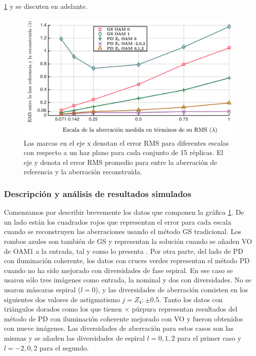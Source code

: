 \ref{fig:ChPD_RMS_error} y se discuten en adelante. 
\begin{figure}[h!]
\centering
\includegraphics[scale=.6]{WF_errors_new_colors_esp.pdf}
\caption[Resultados de simulaciones con PD de iluminación
coherente.]{Las marcas en el eje x denotan el error RMS para
  diferentes escalas con respecto a
  un haz plano para cada conjunto de 15 réplicas. El eje y denota el
  error RMS promedio para entre la aberración de referencia y la
  aberración reconstruída.} 
\label{fig:ChPD_RMS_error}
\end{figure}

\subsubsection{Descripción y análisis de resultados simulados}
Comenzamos por describir brevemente los datos que componen la gráfica
\ref{fig:ChPD_RMS_error}. De un lado están los cuadrados rojos que representan el error
para cada escala cuando se reconstruyen las aberraciones usando el
método GS tradicional. Los rombos azules son también de GS y
representan la solución cuando se añaden VO de OAM1 a la entrada, tal
y como lo presenta . Por otra parte, del lado
de PD con iluminación coherente, los datos con cruces verdes
representan el método PD cuando no ha sido mejorado con
diversidades de fase espiral.
En ese caso se usaron sólo tres imágenes como entrada, la nominal y
dos con diversidades. No se usaron máscaras espiral ($l=0$), y las
diversidades de aberración consisten en los siguientes dos valores de
astigmatismo $j=Z_4:\pm 0.5$. Tanto los datos con triángulos dorados
como los que tienen  $\times$ púrpura representan resultados del
método de PD con iluminación coherente mejorado con VO y fueron
obtenidos con nueve imágenes. Las diversidades de aberración para
estos casos son las mismas y se añaden las diversidades de espiral
$l=0,1,2$ para el primer caso y $l=-2,0,2$ para el segundo.  

